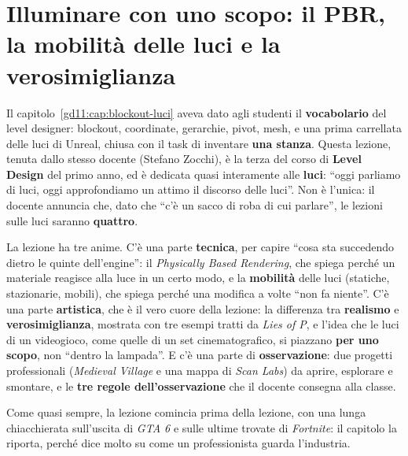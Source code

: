 \chapter[Luci, PBR e verosimiglianza]{Illuminare con uno scopo: il PBR,
la mobilità delle luci e la verosimiglianza}
\label{gd14:cap:luci}

Il capitolo~\ref{gd11:cap:blockout-luci} aveva dato agli studenti il
\textbf{vocabolario} del level designer: blockout, coordinate, gerarchie, pivot,
mesh, e una prima carrellata delle luci di Unreal, chiusa con il task di
inventare \textbf{una stanza}. Questa lezione, tenuta dallo stesso docente
(Stefano Zocchi), è la terza del corso di \textbf{Level Design} del primo anno,
ed è dedicata quasi interamente alle \textbf{luci}: ``oggi parliamo di luci,
oggi approfondiamo un attimo il discorso delle luci''. Non è l'unica: il docente
annuncia che, dato che ``c'è un sacco di roba di cui parlare'', le lezioni sulle
luci saranno \textbf{quattro}.

La lezione ha tre anime. C'è una parte \textbf{tecnica}, per capire ``cosa sta
succedendo dietro le quinte dell'engine'': il \emph{Physically Based Rendering},
che spiega perché un materiale reagisce alla luce in un certo modo, e la
\textbf{mobilità} delle luci (statiche, stazionarie, mobili), che spiega perché
una modifica a volte ``non fa niente''. C'è una parte \textbf{artistica}, che è
il vero cuore della lezione: la differenza tra \textbf{realismo} e
\textbf{verosimiglianza}, mostrata con tre esempi tratti da \emph{Lies of P}, e
l'idea che le luci di un videogioco, come quelle di un set cinematografico, si
piazzano \textbf{per uno scopo}, non ``dentro la lampada''. E c'è una parte di
\textbf{osservazione}: due progetti professionali (\emph{Medieval Village} e una
mappa di \emph{Scan Labs}) da aprire, esplorare e smontare, e le \textbf{tre
regole dell'osservazione} che il docente consegna alla classe.

Come quasi sempre, la lezione comincia prima della lezione, con una lunga
chiacchierata sull'uscita di \emph{GTA 6} e sulle ultime trovate di
\emph{Fortnite}: il capitolo la riporta, perché dice molto su come un
professionista guarda l'industria.

